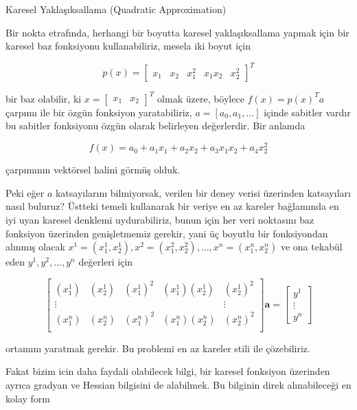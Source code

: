 \documentclass[12pt,fleqn]{article}\usepackage{../../common}
\begin{document}
Karesel Yaklaşıksallama (Quadratic Approximation)

Bir nokta etrafında, herhangi bir boyutta karesel yaklaşıksallama yapmak
için bir karesel baz fonksiyonu kullanabiliriz, mesela iki boyut için

$$
p(x) =
\left[\begin{array}{ccccc} x_1 & x_2 & x_1^2 & x_1x_2 & x_2^2 \end{array}\right]^T
$$

bir baz olabilir, ki $x=\left[\begin{array}{cc} x_1 & x_2 \end{array}\right]^T$ 
olmak üzere, böylece $f(x) = p(x)^T a$ çarpımı ile bir özgün fonksiyon 
yaratabiliriz, $a = [a_0, a_1, ...]$ içinde sabitler vardır bu sabitler 
fonksiyonu özgün olarak belirleyen değerlerdir. Bir anlamda

$$
f(x) = a_0 + a_1 x_1 + a_2 x_2 + a_3 x_1 x_2 + a_4 x_2^2
$$

çarpımının vektörsel halini görmüş olduk. 

Peki eğer $a$ katsayılarını bilmiyorsak, verilen bir deney verisi üzerinden
katsayıları nasıl buluruz? Üstteki temeli kullanarak bir veriye en az
kareler bağlamında en iyi uyan karesel denklemi uydurabiliriz, bunun için
her veri noktasını baz fonksiyon üzerinden genişletmemiz gerekir, yani üç
boyutlu bir fonksiyondan alınmış olacak
$x^1 = (x_1^1,x_2^1), x^2 = (x_1^2,x_2^2), ...,x^n = (x_1^n,x_2^n)$ ve ona
tekabül eden $y^1,y^2,...,y^n$ değerleri için

$$
\left[\begin{array}{ccccc}
 (x_1^1) & (x_2^1) & (x_1^1)^2 & (x_1^1)(x_2^1) & (x_2^1)^2  \\
\vdots & & & & \vdots \\
 (x_1^n) & (x_2^n) & (x_1^n)^2 & (x_1^n)(x_2^n) & (x_2^n)^2  \\
\end{array}\right] 
\mathbf{a} = 
\left[\begin{array}{c}
y^1 \\ \vdots \\ y^n
\end{array}\right]
$$

ortamını yaratmak gerekir. Bu problemi en az kareler stili ile
çözebiliriz. 

Fakat bizim icin daha faydali olabilecek bilgi, bir karesel fonksiyon
üzerinden ayrıca gradyan ve Hessian bilgisini de alabilmek. Bu bilginin
direk alınabileceği en kolay form
\end{document}
